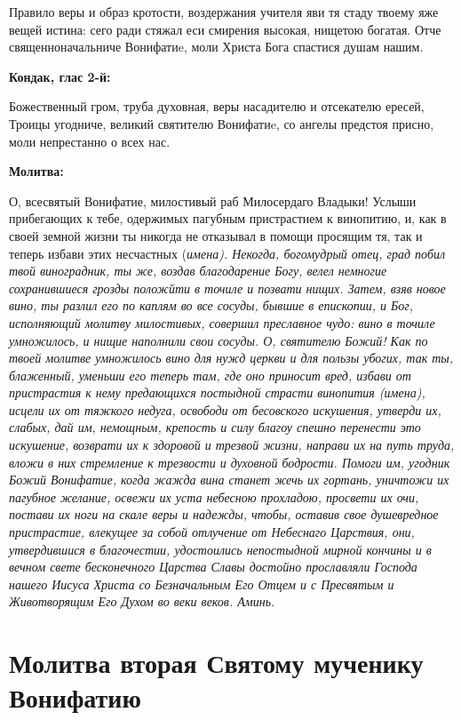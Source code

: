 Правило веры и образ кротости, воздержания учителя яви тя стаду твоему яже вещей истина: сего ради стяжал еси смирения высокая, нищетою богатая. Отче священноначальниче Вонифатиe, моли Христа Бога спастися душам нашим.


\medskip


\bfseries Кондак, глас 2-й:\normalfont{}


Божественный гром, труба духовная, веры насадителю и отсекателю ересей, Троицы угодниче, великий святителю Вонифатиe, со ангелы предстоя присно,  моли непрестанно о всех нас.


\medskip


\bfseries Молитва:\normalfont{}


О, всесвятый Вонифатие, милостивый раб Милосердаго Владыки! Услыши прибегающих к тебе, одержимых пагубным пристрастием к винопитию, и, как в своей земной жизни ты никогда не отказывал в помощи просящим тя, так и теперь избави этих несчастных (\itshape имена\normalfont{}). Некогда, богомудрый отец, град побил твой виноградник, ты же, воздав благодарение Богу, велел немногие сохранившиеся грозды положйти в точиле и позвати нищих. Затем, взяв новое вино, ты разлил его по каплям во все сосуды, бывшие в епископии, и Бог, исполняющий молитву милостивых, совершил преславное чудо: вино в точиле умножилось, и нищие наполнили свои сосуды. О, святителю Божий! Как по твоей молитве умножилось вино для нужд церкви и для пользы убогих, так ты, блаженный, уменьши его теперь там, где оно приносит вред, избави от пристрастия к нему предающихся постыдной страсти винопития (\itshape имена\normalfont{}), исцели их от тяжкого недуга, освободи от бесовского искушения, утверди их, слабых, дай им, немощным, крепость и силу благоу спешно перенести это искушение, возврати их к здоровой и трезвой жизни, направи их на путь труда, вложи в них стремление к трезвости и духовной бодрости. Помоги им, угодник Божий Вонифатие, когда жажда вина станет жечь их гортань, уничтожи их пагубное желание, освежи их уста небесною прохладою, просвети их очи, постави их ноги на скале веры и надежды, чтобы, оставив свое душевредное пристрастие, влекущее за собой отлучение от Небеснаго Царствия, они, утвердившися в благочестии, удостоились непостыдной мирной кончины и в вечном свете бесконечного Царства Славы достойно прославляли Господа нашего Иисуса Христа со Безначальным Его Отцем и с Пресвятым и Животворящим Его Духом во веки веков. Аминь.


\section{Молитва вторая Святому мученику Вонифатию}
 


